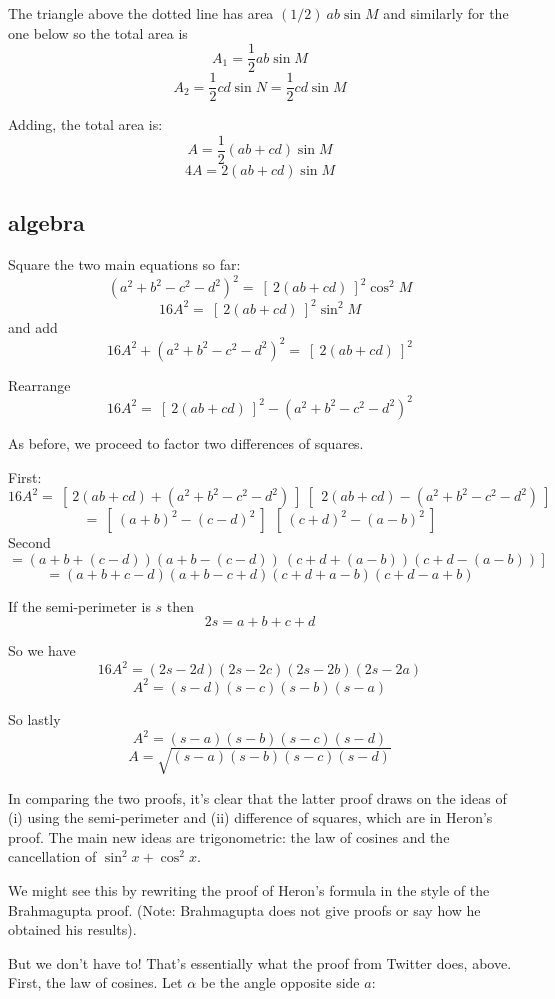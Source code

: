 \documentclass[11pt, oneside]{article}
\begin{document}
The triangle above the dotted line has area $(1/2) \ ab \sin M$ and similarly for the one below so the total area is
\[ A_1 = \frac{1}{2} ab \sin M \]
\[ A_2 = \frac{1}{2} cd \sin N = \frac{1}{2} cd \sin M \]

Adding, the total area is:
\[ A  =  \frac{1}{2}(ab + cd) \sin M \]
\[ 4A =  2(ab + cd) \sin M \]

\subsection*{algebra}

Square the two main equations so far:
\[ (a^2 + b^2 - c^2 - d^2)^2 =  \ [ \ 2(ab + cd) \ ]^2 \cos^2 M \]
\[ 16A^2 =  \ [ \ 2(ab + cd) \ ]^2 \sin^2 M \]
and add
\[ 16A^2 + (a^2 + b^2 - c^2 - d^2)^2 =   \ [ \ 2(ab + cd) \ ]^2 \]

Rearrange
\[ 16A^2 =   \ [ \ 2(ab + cd) \ ]^2 - (a^2 + b^2 - c^2 - d^2)^2 \]

As before, we proceed to factor two differences of squares.  

First:
\[ 16A^2 =   \ [ \ 2(ab + cd) + (a^2 + b^2 - c^2 - d^2) \ ] \ [ \ \ 2(ab + cd) - (a^2 + b^2 - c^2 - d^2) \ ] \]
\[ = \ [ \ (a + b)^2 - (c - d)^2 \ ] \  \ [ \ (c + d)^2 - (a - b)^2 \ ] \]
Second
\[ = (a + b + (c - d))(a + b - (c - d)) \ (c + d + (a - b))(c + d - (a - b)) \ ] \]
\[ = (a + b + c - d)(a + b - c + d)(c + d + a - b)(c + d - a + b) \]

If the semi-perimeter is $s$ then
\[ 2s = a + b + c + d \]

So we have
\[ 16A^2 = (2s - 2d)(2s - 2c)(2s - 2b)(2s - 2a) \]
\[ A^2 = (s - d)(s - c)(s - b)(s - a) \]

So lastly
\[ A^2 = (s - a)(s - b)(s - c)(s - d) \]
\[ A = \sqrt{(s - a)(s - b)(s - c)(s - d)} \]

In comparing the two proofs, it's clear that the latter proof draws on the ideas of (i) using the semi-perimeter and (ii) difference of squares, which are in Heron's proof.  The main new ideas are trigonometric:  the law of cosines and the cancellation of $\sin^2 x + \cos^2 x$.

We might see this by rewriting the proof of Heron's formula in the style of the Brahmagupta proof.  (Note:  Brahmagupta does not give proofs or say how he obtained his results).

But we don't have to!  That's essentially what the proof from Twitter does, above.  First, the law of cosines.  Let $\alpha$ be the angle opposite side $a$:
\end{document}
